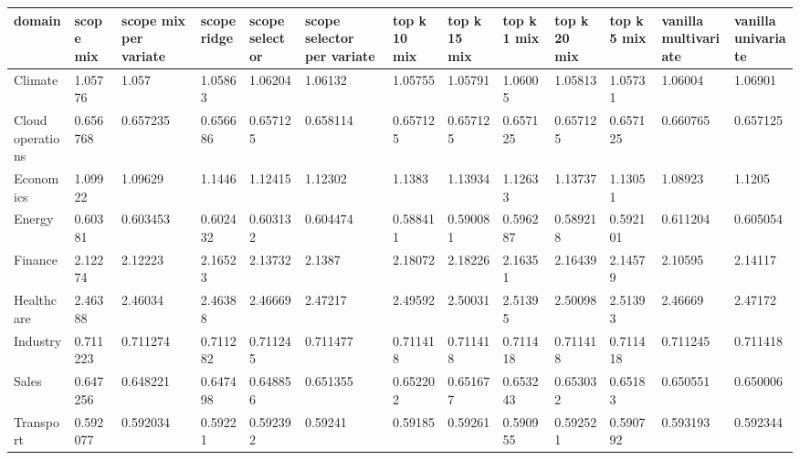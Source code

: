 \begin{tabular}{lllllllllllll}
\toprule
domain & scope mix & scope mix per variate & scope ridge & scope selector & scope selector per variate & top k 10 mix & top k 15 mix & top k 1 mix & top k 20 mix & top k 5 mix & vanilla multivariate & vanilla univariate \\
\midrule
Climate & 1.05776 & 1.057 & 1.05863 & 1.06204 & 1.06132 & 1.05755 & 1.05791 & 1.06005 & 1.05813 & 1.05731 & 1.06004 & 1.06901 \\
Cloud operations & 0.656768 & 0.657235 & 0.656686 & 0.657125 & 0.658114 & 0.657125 & 0.657125 & 0.657125 & 0.657125 & 0.657125 & 0.660765 & 0.657125 \\
Economics & 1.09922 & 1.09629 & 1.1446 & 1.12415 & 1.12302 & 1.1383 & 1.13934 & 1.12633 & 1.13737 & 1.13051 & 1.08923 & 1.1205 \\
Energy & 0.60381 & 0.603453 & 0.602432 & 0.603132 & 0.604474 & 0.588411 & 0.590081 & 0.596287 & 0.589218 & 0.592101 & 0.611204 & 0.605054 \\
Finance & 2.12274 & 2.12223 & 2.16523 & 2.13732 & 2.1387 & 2.18072 & 2.18226 & 2.16351 & 2.16439 & 2.14579 & 2.10595 & 2.14117 \\
Healthcare & 2.46388 & 2.46034 & 2.46388 & 2.46669 & 2.47217 & 2.49592 & 2.50031 & 2.51395 & 2.50098 & 2.51393 & 2.46669 & 2.47172 \\
Industry & 0.711223 & 0.711274 & 0.711282 & 0.711245 & 0.711477 & 0.711418 & 0.711418 & 0.711418 & 0.711418 & 0.711418 & 0.711245 & 0.711418 \\
Sales & 0.647256 & 0.648221 & 0.647498 & 0.648856 & 0.651355 & 0.652202 & 0.651677 & 0.653243 & 0.653032 & 0.65183 & 0.650551 & 0.650006 \\
Transport & 0.592077 & 0.592034 & 0.59221 & 0.592392 & 0.59241 & 0.59185 & 0.59261 & 0.590955 & 0.592521 & 0.590792 & 0.593193 & 0.592344 \\
\bottomrule
\end{tabular}
